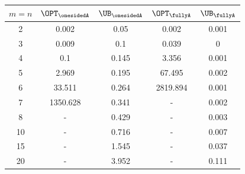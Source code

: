 \begin{tabular}{cc|c|c|c}
        \toprule
        $m=n$ & $\OPT_\onesidedA$ & $\UB_\onesidedA$ & $\OPT_\fullyA$ & $\UB_\fullyA$ \\ 
        \midrule
        2 & 0.002 & 0.05 & 0.002 & 0.001 \\
        3 & 0.009 & 0.1 & 0.039 & 0 \\
        4 & 0.1 & 0.145 & 3.356 & 0.001 \\
        5 & 2.969 & 0.195 & 67.495 & 0.002 \\
        6 & 33.511 & 0.264 & 2819.894 & 0.001 \\
        7 & 1350.628 & 0.341 & - & 0.002 \\
        8 & - & 0.429 & - & 0.003 \\
        10 & - & 0.716 & - & 0.007 \\
        15 & - & 1.545 & - & 0.037 \\
        20 & - & 3.952 & - & 0.111 \\
        \bottomrule
\end{tabular}
